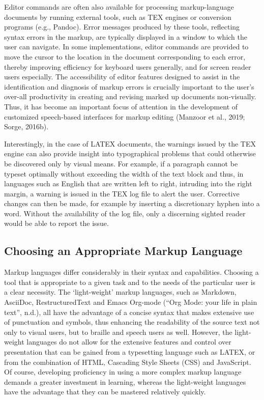 \documentclass[11pt]{sig-alternate}
\begin{document}
\begin{large}
Editor commands are often also available for processing markup-language documents by running external tools, such as TEX engines or conversion programs (e.g., Pandoc). Error messages produced by these tools, reflecting syntax errors in the markup, are typically displayed in a window to which the user can navigate. In some implementations, editor commands are provided to move the cursor to the location in the document corresponding to each error, thereby improving efficiency for keyboard users generally, and for screen reader users especially. The accessibility of editor features designed to assist in the identification and diagnosis of mark\-up errors is crucially important to the user’s over-all productivity in creating and revising marked up documents non-visually. Thus, it has become an important focus of attention in the development of customized speech-based interfaces for markup editing (Manzoor et al., 2019; Sorge, 2016b).

Interestingly, in the case of LATEX documents, the warnings issued by the TEX engine can also provide insight into typographical problems that could otherwise be discovered only by visual means. For example, if a paragraph cannot be typeset optimally without exceeding the width of the text block and thus, in languages such as English that are written left to right, intruding into the right margin, a warning is issued in the TEX log file to alert the user. Corrective changes can then be made, for example by inserting a discretionary hyphen into a word. Without the availability of the log file, only a discerning sighted reader would be able to report the issue.

\subsection*{Choosing an Appropriate Markup Language}
Markup languages differ considerably in their syntax and capabilities. Choosing a tool that is appropriate to a given task and to the needs of the particular user is a clear necessity. The ‘light-weight’ markup languages, such as Markdown, AsciiDoc, RestructuredText and Emacs Org-mode (“Org Mode: your life in plain text”, n.d.), all have the advantage of a concise syntax that makes extensive use of punctuation and symbols, thus enhancing the readability of the source text not only to visual users, but to braille and speech users as well. However, the light-weight languages do not allow for the extensive features and control over presentation that can be gained from a typesetting language such as LATEX, or from the combination of HTML, Cascading Style Sheets (CSS) and JavaScript. Of course, developing proficiency in using a more complex markup language demands a greater investment in learning, whereas the light-weight languages have the advantage that they can be mastered relatively quickly.


\end{large}
\end{document}
